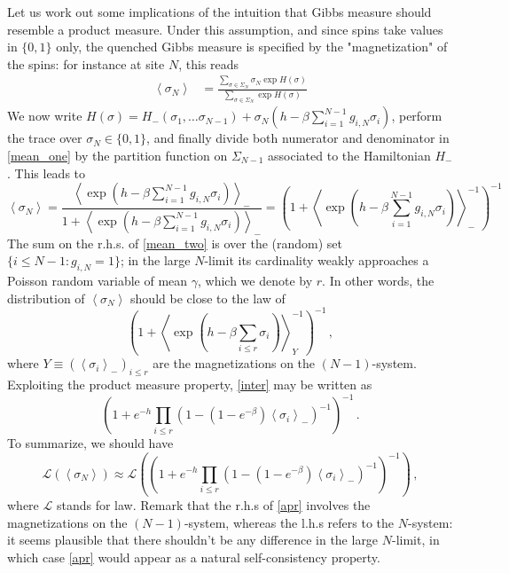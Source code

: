 \documentclass[a4paper,12pt,oneside,reqno]{amsart}
\numberwithin{equation}{section}
\begin{document}
Let us work out some implications of the intuition that Gibbs measure should resemble a product measure. Under this assumption, and since spins take values in $\{0,1\}$ only, the quenched Gibbs measure is specified by the  "magnetization" of the spins: for instance at site $N$, this reads
\begin{equation} \begin{aligned} \label{mean_one}
\left< {\sigma}_N \right> & = \frac{\sum_{{\sigma} \in \Sigma_N} {\sigma}_N \exp H({\sigma})}{\sum_{{\sigma} \in \Sigma_N} \exp H({\sigma}) }
\end{aligned} \end{equation}
We now write $H({\sigma}) = H_-({\sigma}_1, \dots {\sigma}_{N-1}) + {\sigma}_N \left( h- {\beta} \sum_{i=1}^{N-1} g_{i, N} {\sigma}_i \right)$, perform the trace over ${\sigma}_N \in \{0,1\}$, and finally divide both numerator and denominator in \eqref{mean_one} by the partition function on $\Sigma_{N-1}$ associated to  the Hamiltonian $H_-$. This leads to
\begin{equation} \label{mean_two}
\left< {\sigma}_N \right> = \frac{\left< \exp\left( h- {\beta} \sum_{i=1}^{N-1} g_{i, N} {\sigma}_i \right)\right>_-}{1+\left< \exp\left( h- {\beta} \sum_{i=1}^{N-1} g_{i, N} {\sigma}_i \right)\right>_-} = \left( 1+\left< \exp\left( h- {\beta} \sum_{i=1}^{N-1} g_{i, N} {\sigma}_i \right)\right>_{-}^{-1} \right)^{-1}
\end{equation}
The sum on the r.h.s. of \eqref{mean_two} is over the (random) set $\{i\leq N-1: g_{i,N} = 1\}$; in the large $N$-limit its cardinality weakly approaches a Poisson random variable of mean $\gamma$, which we denote by $r$.  In other words, the distribution of $\left< {\sigma}_N\right>$ should be close to the law of 
\begin{equation} \label{inter}
\left( 1+\left< \exp\left( h- {\beta} \sum_{i\leq r} {\sigma}_i \right)\right>_Y^{-1} \right)^{-1}\,,
\end{equation}
where $Y {\equiv} \left( \left< {\sigma}_i \right>_- \right)_{i \leq r}$ are the magnetizations on the $(N-1)$-system. Exploiting the product measure property, \eqref{inter} may be written as 
\begin{equation} \label{will show up again}
\left( 1+ e^{-h} \prod_{i\leq r} \left( 1-  \left( 1- e^{-{\beta}} \right) \left< {\sigma}_i \right>_- \right)^{-1} \right)^{-1} \,.
\end{equation}
To summarize, we should have 
\begin{equation} \label{apr}
\mathcal L\left( \left< {\sigma}_N \right> \right) \approx \mathcal L\left( \left( 1+ e^{-h} \prod_{i\leq r} \left( 1-  \left( 1- e^{-{\beta}} \right) \left< {\sigma}_i \right>_- \right)^{-1} \right)^{-1} \right) \,,
\end{equation}
where $\mathcal L$ stands for law. Remark that the r.h.s of \eqref{apr} involves the magnetizations on the $(N-1)$-system, whereas the l.h.s refers to the $N$-system: it seems plausible that there shouldn't be any difference in the large $N$-limit, in which case \eqref{apr} would appear as a natural self-consistency property. 
\end{document}
